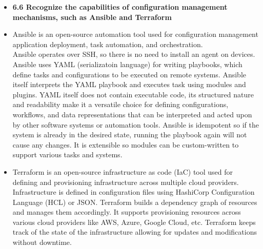 \documentclass{article}
\begin{document}
\begin{itemize}
  \item \textbf{6.6 Recognize the capabilities of configuration management mechanisms, such as Ansible and Terraform}
  	\item[] Ansible is an open-source automation tool used for configuration management application deployment, task automation, and orchestration.\\
			Ansible operates over SSH, so there is no need to install an agent on devices. Ansible uses YAML (serializatoin language) for writing playbooks, which define tasks and configurations to be executed on remote systems. Ansible itself interprets the YAML playbook and executes task using modules and plugins. YAML itself does not contain executable code, its structured nature and readability make it a versatile choice for defining configurations, workflows, and data representations that can be interpreted and acted upon by other software systems or automation tools. Ansible is idempotent so if the system is already in the desired state, running the playbook again will not cause any changes. It is extensible so modules can be custom-written to support various tasks and systems.
	\item[] Terraform is an open-source infrastructure as code (IaC) tool used for defining and provisioning infrastructure across multiple cloud providers.\\
			Infrastructure is defined in configuration files using HashiCorp Configuration Language (HCL) or JSON. Terraform builds a dependency graph of resources and manages them accordingly. It supports provisioning resources across various cloud providers like AWS, Azure, Google Cloud, etc. Terraform keeps track of the state of the infrastructure allowing for updates and modifications without downtime.
  

\end{itemize}
\end{document}
